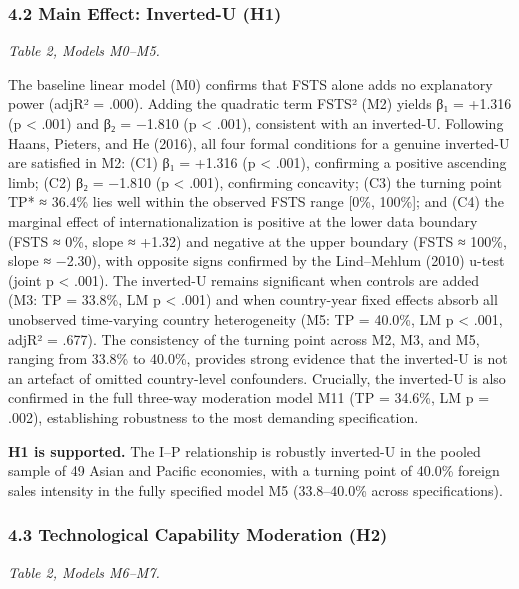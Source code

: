 \documentclass[
  12pt,a4paper]{article}
\begin{document}
\hypertarget{main-effect-inverted-u-h1}{%
\subsubsection{4.2 Main Effect: Inverted-U
(H1)}\label{main-effect-inverted-u-h1}}

\emph{Table 2, Models M0--M5.}

The baseline linear model (M0) confirms that FSTS alone adds no
explanatory power (adjR² = .000). Adding the quadratic term FSTS² (M2)
yields β₁ = +1.316 (p \textless{} .001) and β₂ = −1.810 (p \textless{}
.001), consistent with an inverted-U. Following Haans, Pieters, and He
(2016), all four formal conditions for a genuine inverted-U are
satisfied in M2: (C1) β₁ = +1.316 (p \textless{} .001), confirming a
positive ascending limb; (C2) β₂ = −1.810 (p \textless{} .001),
confirming concavity; (C3) the turning point TP* ≈ 36.4\% lies well
within the observed FSTS range {[}0\%, 100\%{]}; and (C4) the marginal
effect of internationalization is positive at the lower data boundary
(FSTS ≈ 0\%, slope ≈ +1.32) and negative at the upper boundary (FSTS ≈
100\%, slope ≈ −2.30), with opposite signs confirmed by the Lind--Mehlum
(2010) u-test (joint p \textless{} .001). The inverted-U remains
significant when controls are added (M3: TP = 33.8\%, LM p \textless{}
.001) and when country-year fixed effects absorb all unobserved
time-varying country heterogeneity (M5: TP = 40.0\%, LM p \textless{}
.001, adjR² = .677). The consistency of the turning point across M2, M3,
and M5, ranging from 33.8\% to 40.0\%, provides strong evidence that the
inverted-U is not an artefact of omitted country-level confounders.
Crucially, the inverted-U is also confirmed in the full three-way
moderation model M11 (TP = 34.6\%, LM p = .002), establishing robustness
to the most demanding specification.

\textbf{H1 is supported.} The I--P relationship is robustly inverted-U
in the pooled sample of 49 Asian and Pacific economies, with a turning
point of 40.0\% foreign sales intensity in the fully specified model M5
(33.8--40.0\% across specifications).

\hypertarget{technological-capability-moderation-h2}{%
\subsubsection{4.3 Technological Capability Moderation
(H2)}\label{technological-capability-moderation-h2}}

\emph{Table 2, Models M6--M7.}
\end{document}
